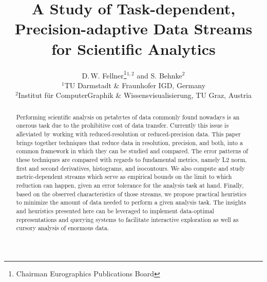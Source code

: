 \documentclass{egpubl}
\title[EG \LaTeX\ Author Guidelines]%
{A Study of Task-dependent, Precision-adaptive Data Streams for Scientific Analytics}
\author[D. Fellner \& S. Behnke]
{D.\,W. Fellner\thanks{Chairman Eurographics Publications Board}$^{1,2}$
  and S. Behnke$^{2}$
  \\
  $^1$TU Darmstadt \& Fraunhofer IGD, Germany\\
  $^2$Institut f{\"u}r ComputerGraphik \& Wissensvisualisierung, TU Graz, Austria
}
\begin{document}
  

\maketitle

\newcommand{\norm}[1]{\left\lVert#1\right\rVert}
\begin{abstract}
Performing scientific analysis on petabytes of data commonly found nowadays is an onerous task
due to the prohibitive cost of data transfer. Currently this issue is alleviated by working with
reduced-resolution or reduced-precision data. This paper brings together techniques that reduce data
in resolution, precision, and both, into a common framework in which they can be studied and
compared. The error patterns of these techniques are compared with regards to fundamental metrics, namely L2 norm,
first and second derivatives, histograms, and isocontours. We also compute and study
metric-dependent streams which serve as empirical bounds on the limit to which
reduction can happen, given an error tolerance for the analysis task at hand. Finally, based on the
observed characteristics of those streams, we propose practical heuristics to minimize the amount of
data needed to perform a given analysis task. The insights and heuristics presented here can be
leveraged to implement data-optimal representations and querying systems to facilitate interactive
exploration as well as cursory analysis of enormous data.  
\begin{classification} %
\end{classification}
  
\end{abstract}















\end{document}
